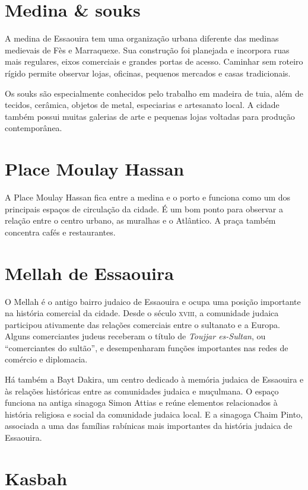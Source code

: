 \chapter{Medina \& souks}

A medina de Essaouira tem uma organização urbana diferente das medinas medievais de Fès e Marraquexe. Sua construção foi planejada e incorpora ruas mais regulares, eixos comerciais e grandes portas de acesso. Caminhar sem roteiro rígido permite observar lojas, oficinas, pequenos mercados e casas tradicionais.

Os souks são especialmente conhecidos pelo trabalho em madeira de tuia, além de tecidos, cerâmica, objetos de metal, especiarias e artesanato local. A cidade também possui muitas galerias de arte e pequenas lojas voltadas para produção contemporânea.

\chapter{Place Moulay Hassan}

A Place Moulay Hassan fica entre a medina e o porto e funciona como um dos principais espaços de circulação da cidade. É um bom ponto para observar a relação entre o centro urbano, as muralhas e o Atlântico. A praça também concentra cafés e restaurantes.

\chapter{Mellah de Essaouira}

O Mellah é o antigo bairro judaico de Essaouira e ocupa uma posição importante na história comercial da cidade. Desde o século \textsc{xviii}, a comunidade judaica participou ativamente das relações comerciais entre o sultanato e a Europa. Alguns comerciantes judeus receberam o título de \textit{Toujjar es-Sultan}, ou ``comerciantes do sultão'', e desempenharam funções importantes nas redes de comércio e diplomacia.

Há também a Bayt Dakira, um centro dedicado à memória judaica de Essaouira e às relações históricas entre as comunidades judaica e muçulmana. O espaço funciona na antiga sinagoga Simon Attias e reúne elementos relacionados à história religiosa e social da comunidade judaica local. E a sinagoga Chaim Pinto, associada a uma das famílias rabínicas mais importantes da história judaica de Essaouira.

\chapter{Kasbah}

